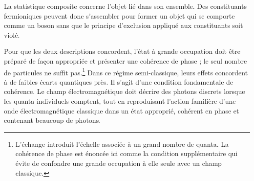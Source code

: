 \begin{classroomqa}\end{classroomqa}

La statistique composite concerne l’objet lié dans son ensemble. Des constituants fermioniques peuvent donc s’assembler pour former un objet qui se comporte comme un boson sans que le principe d’exclusion appliqué aux constituants soit violé.

\begin{classroomqa}\end{classroomqa}

Pour que les deux descriptions concordent, l’état à grande occupation doit être préparé de façon appropriée et présenter une cohérence de phase ; le seul nombre de particules ne suffit pas.\footnote{L’échange introduit l’échelle associée à un grand nombre de quanta. La cohérence de phase est énoncée ici comme la condition supplémentaire qui évite de confondre une grande occupation à elle seule avec un champ classique.} Dans ce régime semi-classique, leurs effets concordent à de faibles écarts quantiques près. Il s’agit d’une condition fondamentale de cohérence. Le champ électromagnétique doit décrire des photons discrets lorsque les quanta individuels comptent, tout en reproduisant l’action familière d’une onde électromagnétique classique dans un état approprié, cohérent en phase et contenant beaucoup de photons.